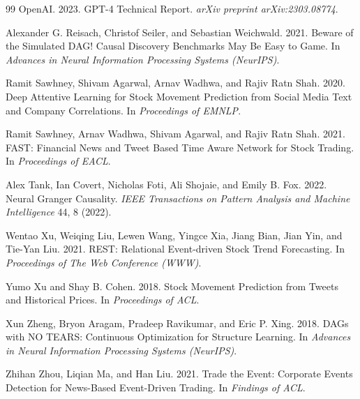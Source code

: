 \documentclass[sigconf,nonacm]{acmart}
\begin{document}
\begin{thebibliography}{99}
OpenAI. 2023.
\newblock GPT-4 Technical Report.
\newblock \emph{arXiv preprint arXiv:2303.08774}.

Alexander G. Reisach, Christof Seiler, and Sebastian Weichwald. 2021.
\newblock Beware of the Simulated DAG! Causal Discovery Benchmarks May Be
Easy to Game.
\newblock In \emph{Advances in Neural Information Processing Systems
(NeurIPS)}.

Ramit Sawhney, Shivam Agarwal, Arnav Wadhwa, and Rajiv Ratn Shah. 2020.
\newblock Deep Attentive Learning for Stock Movement Prediction from
Social Media Text and Company Correlations.
\newblock In \emph{Proceedings of EMNLP}.

Ramit Sawhney, Arnav Wadhwa, Shivam Agarwal, and Rajiv Ratn Shah. 2021.
\newblock FAST: Financial News and Tweet Based Time Aware Network for
Stock Trading.
\newblock In \emph{Proceedings of EACL}.

Alex Tank, Ian Covert, Nicholas Foti, Ali Shojaie, and Emily B. Fox.
2022.
\newblock Neural Granger Causality.
\newblock \emph{IEEE Transactions on Pattern Analysis and Machine
Intelligence} 44, 8 (2022).

Wentao Xu, Weiqing Liu, Lewen Wang, Yingce Xia, Jiang Bian, Jian Yin,
and Tie-Yan Liu. 2021.
\newblock REST: Relational Event-driven Stock Trend Forecasting.
\newblock In \emph{Proceedings of The Web Conference (WWW)}.

Yumo Xu and Shay B. Cohen. 2018.
\newblock Stock Movement Prediction from Tweets and Historical Prices.
\newblock In \emph{Proceedings of ACL}.

Xun Zheng, Bryon Aragam, Pradeep Ravikumar, and Eric P. Xing. 2018.
\newblock DAGs with NO TEARS: Continuous Optimization for Structure
Learning.
\newblock In \emph{Advances in Neural Information Processing Systems
(NeurIPS)}.

Zhihan Zhou, Liqian Ma, and Han Liu. 2021.
\newblock Trade the Event: Corporate Events Detection for News-Based
Event-Driven Trading.
\newblock In \emph{Findings of ACL}.

\end{thebibliography}
\end{document}
